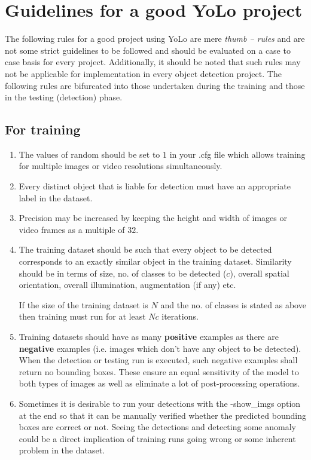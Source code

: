 \section{Guidelines for a good YoLo project} \label{mod_guides}
The following rules for a good project using YoLo are mere \textit{thumb – rules} and are not some strict guidelines to be followed and should be evaluated on a case to case basis for every project. Additionally, it should be noted that such rules may not be applicable for implementation in every object detection project. The following rules are bifurcated into those undertaken during the training and those in the testing (detection) phase.

\subsection{For training} \label{for_train_guide}

\begin{enumerate}
  \item The values of {\selectfont random} should be set to $1$ in your  {\selectfont .cfg} file which allows training for multiple images or video resolutions simultaneously.
  \item Every distinct object that is liable for detection must have an appropriate label in the dataset.
  \item Precision may be increased by keeping the height and width of images or video frames as a multiple of $32$.
  \item The training dataset should be such that every object to be detected corresponds to an exactly similar object in the training dataset. Similarity should be in terms of size, no. of classes to be detected ($c$), overall spatial orientation, overall illumination, augmentation (if any) etc. \par

        If the size of the training dataset is $N$ and the no. of classes is stated as above then training must run for at least $Nc$ iterations.
  \item Training datasets should have as many \textbf{positive} examples as there are \textbf{negative} examples (i.e. images which don’t have any object to be detected). When the detection or testing run is executed, such negative examples shall return no bounding boxes. These ensure an equal sensitivity of the model to both types of images as well as eliminate a lot of post-processing operations.
  \item Sometimes it is desirable to run your detections with the {\selectfont -show\_imgs} option at the end so that it can be manually verified whether the predicted bounding boxes are correct or not. Seeing the detections and detecting some anomaly could be a direct implication of training runs going wrong or some inherent problem in the dataset.
\end{enumerate}



